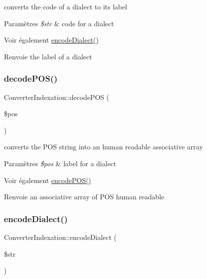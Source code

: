 converts the code of a dialect to its label 


\begin{DoxyParams}{Paramètres}
{\em \$str} & code for a dialect \\
\hline
\end{DoxyParams}
\begin{DoxySeeAlso}{Voir également}
\hyperlink{class_converter_indexation_ab9501f7ab3dad7daa338023522f03949}{encode\+Dialect()} 
\end{DoxySeeAlso}
\begin{DoxyReturn}{Renvoie}
the label of a dialect 
\end{DoxyReturn}
\hypertarget{class_converter_indexation_a6012e4df4619a7cc1c55c811fc50690d}{}\label{class_converter_indexation_a6012e4df4619a7cc1c55c811fc50690d} 
\subsubsection{\texorpdfstring{decode\+P\+O\+S()}{decodePOS()}}
{\footnotesize\ttfamily Converter\+Indexation\+::decode\+P\+OS (\begin{DoxyParamCaption}\item[{}]{\$pos }\end{DoxyParamCaption})}



converts the P\+OS string into an human readable associative array 


\begin{DoxyParams}{Paramètres}
{\em \$pos} & label for a dialect \\
\hline
\end{DoxyParams}
\begin{DoxySeeAlso}{Voir également}
\hyperlink{class_converter_indexation_a8b52ecc585f7423456ae6aaf5df2436f}{encode\+P\+O\+S()} 
\end{DoxySeeAlso}
\begin{DoxyReturn}{Renvoie}
an associative array of P\+OS human readable 
\end{DoxyReturn}
\hypertarget{class_converter_indexation_ab9501f7ab3dad7daa338023522f03949}{}\label{class_converter_indexation_ab9501f7ab3dad7daa338023522f03949} 
\subsubsection{\texorpdfstring{encode\+Dialect()}{encodeDialect()}}
{\footnotesize\ttfamily Converter\+Indexation\+::encode\+Dialect (\begin{DoxyParamCaption}\item[{}]{\$str }\end{DoxyParamCaption})}




